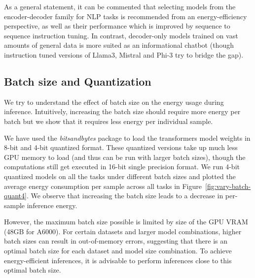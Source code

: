 As a general statement, it can be commented that selecting models from the encoder-decoder family for NLP tasks is recommended from an energy-efficiency perspective, as well as their performance which is improved by sequence to sequence instruction tuning. 
In contrast, decoder-only models trained on vast amounts of general data is more suited as an informational chatbot (though instruction tuned versions of Llama3, Mistral and Phi-3 try to bridge the gap).









\subsection{Batch size and Quantization}
\label{sec:batch}
We try to understand the effect of batch size on the energy usage during inference. 
%
Intuitively, increasing the batch size should require more energy per batch but we show that it
requires less energy per individual sample. 
 
%

We have used the \textit{bitsandbytes} package to load the transformers model weights in 8-bit and 4-bit quantized format. These quantized versions take up much less GPU memory to load (and thus can be run with larger batch sizes), though the computations still get executed in 16-bit single precision format. 
%
We run 4-bit quantized models on all the tasks under different batch sizes and plotted the average energy consumption per sample across all tasks in Figure~\ref{fig:vary-batch-quant4}. 
%
We observe that increasing the batch size leads to a decrease in per-sample inference energy.
%
%

However, the maximum batch size possible is limited by size of the GPU VRAM (48GB for A6000).
For certain datasets and larger model combinations, higher batch sizes can result in out-of-memory errors, suggesting that there is an optimal batch size for each dataset and model size combination. To achieve energy-efficient inferences, it is advisable to perform inferences close to this optimal batch size.%

